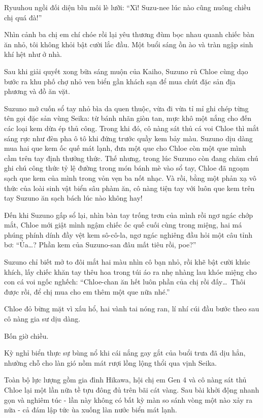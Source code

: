 \documentclass[../main.tex]{subfiles}
\begin{document}
Ryuuhou ngồi đối diện bĩu môi lè lưỡi: ``Xì! Suzu-nee lúc nào cũng nuông chiều chị quá đà!''

Nhìn cảnh ba chị em chí chóe rồi lại yêu thương đùm bọc nhau quanh chiếc bàn ăn nhỏ, tôi không khỏi bật cười lắc đầu. Một buổi sáng ồn ào và tràn ngập sinh khí hệt như ở nhà.

\ct
Sau khi giải quyết xong bữa sáng muộn của Kaiho, Suzuno rủ Chloe cùng dạo bước ra khu phố chợ nhỏ ven biển gần khách sạn để mua chút đặc sản địa phương và đồ ăn vặt.

Suzuno mở cuốn sổ tay nhỏ bìa da quen thuộc, vừa đi vừa tỉ mỉ ghi chép từng tên gọi đặc sản vùng Seika: từ bánh nhãn giòn tan, mực khô một nắng cho đến các loại kem dừa ép thủ công. Trong khi đó, cô nàng sát thủ cá voi Chloe thì mắt sáng rực như đèn pha ô tô khi đứng trước quầy kem bảy màu. Suzuno dịu dàng mua hai que kem ốc quế mát lạnh, đưa một que cho Chloe còn một que mình cầm trên tay định thưởng thức. Thế nhưng, trong lúc Suzuno còn đang chăm chú ghi chú công thức tỷ lệ đường trong món bánh mè vào sổ tay, Chloe đã ngoạm sạch que kem của mình trong vỏn vẹn ba nốt nhạc. Và rồi, bằng một phản xạ vô thức của loài sinh vật biển sâu phàm ăn, cô nàng tiện tay với luôn que kem trên tay Suzuno ăn sạch bách lúc nào không hay!

Đến khi Suzuno gấp sổ lại, nhìn bàn tay trống trơn của mình rồi ngơ ngác chớp mắt, Chloe mới giật mình ngậm chiếc ốc quế cuối cùng trong miệng, hai má phúng phính dính đầy vệt kem sô-cô-la, ngơ ngác nghiêng đầu hỏi một câu tỉnh bơ: ``Ủa\dots? Phần kem của Suzuno-san đâu mất tiêu rồi, poe?''

Suzuno chỉ biết mở to đôi mắt hai màu nhìn cô bạn nhỏ, rồi khẽ bật cười khúc khích, lấy chiếc khăn tay thêu hoa trong túi áo ra nhẹ nhàng lau khóe miệng cho con cá voi ngốc nghếch: ``Chloe-chan ăn hết luôn phần của chị rồi đấy\dots\ Thôi được rồi, để chị mua cho em thêm một que nữa nhé.''

Chloe đỏ bừng mặt vì xấu hổ, hai vành tai nóng ran, lí nhí cúi đầu bước theo sau cô nàng gia sư dịu dàng.

\ct

Bốn giờ chiều.

Kỳ nghỉ biển thực sự bùng nổ khi cái nắng gay gắt của buổi trưa đã dịu hẳn, nhường chỗ cho làn gió nồm mát rượi lồng lộng thổi qua vịnh Seika.

Toàn bộ lực lượng gồm gia đình Hikawa, hội chị em Gen 4 và cô nàng sát thủ Chloe lại một lần nữa tề tựu đông đủ trên bãi cát vàng. Sau bài khởi động nhanh gọn và nghiêm túc - lần này không có bất kỳ màn so sánh vòng một nào xảy ra nữa - cả đám lập tức ùa xuống làn nước biển mát lạnh.
\end{document}
